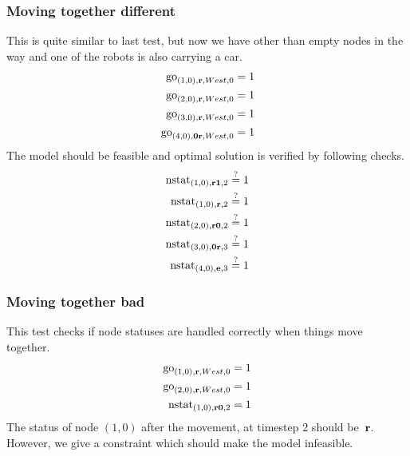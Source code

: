 \subsubsection{Moving together different}
This is quite similar to last test, but now we have other than empty nodes in
the way and one of the robots is also carrying a car.
\begin{align}
    \mathrm{go}_{(1,0),\text{\bf r},West,0} &= 1\\
    \mathrm{go}_{(2,0),\text{\bf r},West,0} &= 1\\
    \mathrm{go}_{(3,0),\text{\bf r},West,0} &= 1\\
    \mathrm{go}_{(4,0),\text{\bf 0r},West,0} &= 1
\end{align}
The model should be feasible and optimal solution is verified by following
checks.
\begin{align}
    \mathrm{nstat}_{(1,0), \text{\bf r1}, 2} &\overset{?}{=} 1\\
    \mathrm{nstat}_{(1,0), \text{\bf r}, 2} &\overset{?}{=} 1\\
    \mathrm{nstat}_{(2,0), \text{\bf r0}, 2} &\overset{?}{=} 1\\
    \mathrm{nstat}_{(3,0), \text{\bf 0r}, 3} &\overset{?}{=} 1\\
    \mathrm{nstat}_{(4,0), \text{\bf e}, 3} &\overset{?}{=} 1
\end{align}

\subsubsection{Moving together bad}
This test checks if node statuses are handled correctly when things move
together.
\begin{align}
    \mathrm{go}_{(1,0),\text{\bf r},West,0} &= 1\\
    \mathrm{go}_{(2,0),\text{\bf r},West,0} &= 1\\
    \mathrm{nstat}_{(1,0),\text{\bf r0},2} &= 1
\end{align}
The status of node $(1,0)$ after the movement, at timestep 2 should
be~$\text{\bf r}$. However, we give a constraint which should make the model
infeasible.
